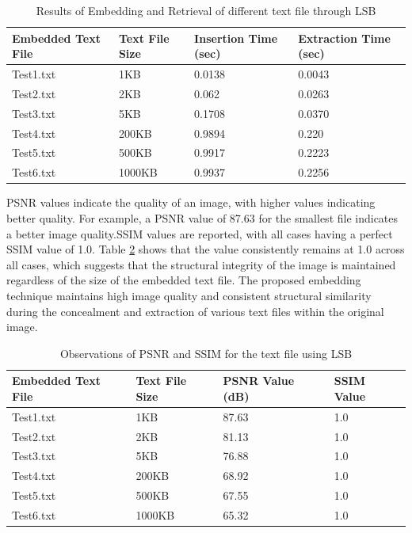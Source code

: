 \documentclass{ieeeaccess}
\begin{document}
\begin{table}[htbp]
\centering
\caption{Results of Embedding and Retrieval of different text file through LSB}
\label{Observation-LSB-insertion}

\begin{tabular}{|p{2.2 cm}|p{1.5 cm}|p{1.5 cm}|p{1.5 cm}|}
\hline
\textbf{Embedded Text File} & \textbf{Text File Size} & \textbf{Insertion Time (sec)} & \textbf{Extraction Time (sec)} \\ \hline
Test1.txt & 1KB & 0.0138 & 0.0043 \\ \hline
Test2.txt & 2KB & 0.062 & 0.0263 \\ \hline
Test3.txt & 5KB & 0.1708 & 0.0370 \\ \hline
Test4.txt & 200KB & 0.9894 & 0.220 \\ \hline
Test5.txt & 500KB & 0.9917 & 0.2223 \\ \hline
Test6.txt & 1000KB & 0.9937 & 0.2256 \\ \hline
\end{tabular}
\end{table}

PSNR values indicate the quality of an image, with higher values indicating better quality. For example, a PSNR value of 87.63 for the smallest file indicates a better image quality.SSIM values are reported, with all cases having a perfect SSIM value of 1.0. Table \ref{psnr} shows that the value consistently remains at 1.0 across all cases, which suggests that the structural integrity of the image is maintained regardless of the size of the embedded text file.
The proposed embedding technique maintains high image quality and consistent structural similarity during the concealment and extraction of various text files within the original image.


\begin{table}[htbp]
\centering
\caption{Observations of PSNR and SSIM for the text file using LSB }
\label{psnr}
\begin{tabular}{|p{2.2 cm}|p{1.5 cm}|p{1.5 cm}|p{1.5 cm}|}
\hline
\textbf{Embedded Text File} & \textbf{Text File Size} & \textbf{PSNR
Value (dB)
} & \textbf{SSIM
Value
} \\ \hline
Test1.txt & 1KB & 87.63 & 1.0 \\ \hline
Test2.txt & 2KB & 81.13 & 1.0 \\ \hline
Test3.txt & 5KB & 76.88 & 1.0 \\ \hline
Test4.txt & 200KB & 68.92 & 1.0 \\ \hline
Test5.txt & 500KB & 67.55 & 1.0 \\ \hline
Test6.txt & 1000KB & 65.32 & 1.0 \\ \hline
\end{tabular}
\end{table}
\end{document}
